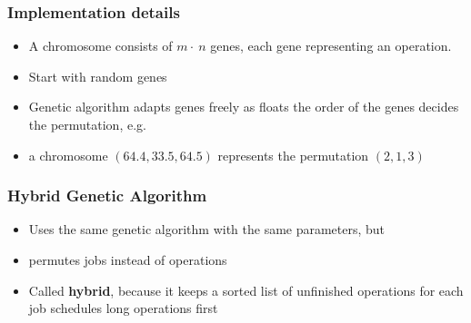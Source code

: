 
\begin{frame}
    \frametitle{Implementation details}
    \begin{itemize}

    	\item A chromosome consists of $m\cdot~n$ genes, each gene representing an operation.

    	\item Start with random genes

    	\item Genetic algorithm adapts genes freely as floats \textrightarrow the order of the genes decides the permutation, e.g.

    	\item a chromosome $(64.4, 33.5, 64.5)$ represents the permutation $(2,1,3)$
    \end{itemize}
\end{frame}


\begin{frame}
  \frametitle{Hybrid Genetic Algorithm}
\begin{itemize}

	\item 	Uses the same genetic algorithm with the same parameters, but

	\item  	permutes jobs instead of operations

	\item 	Called \textbf{hybrid}, because it keeps a sorted list of unfinished operations for each job \textrightarrow schedules long operations first
	
\end{itemize}


 
\end{frame}


